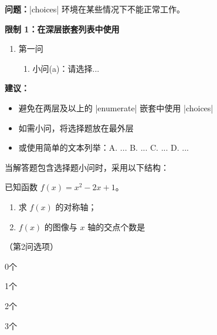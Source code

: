 \textbf{问题：}|choices| 环境在某些情况下不能正常工作。

\textbf{限制 1：在深层嵌套列表中使用}

\begin{latexcode}
  \begin{question}
    \begin{enumerate}
      \item 第一问
        \begin{enumerate}
          \item 小问(a)：请选择...\paren[A]
        \end{enumerate}
    \end{enumerate}
  \end{question}
\end{latexcode}

\textbf{建议：}
\begin{itemize}
  \item 避免在两层及以上的 |enumerate| 嵌套中使用 |choices|
  \item 如需小问，将选择题放在最外层
  \item 或使用简单的文本列举：A. ... B. ... C. ... D. ...
\end{itemize}

\begin{tcolorbox}[colback=blue!5!white, colframe=blue!75!black, title=\textbf{推荐做法}]
当解答题包含选择题小问时，采用以下结构：

\begin{latexcode}
\begin{problem}
  已知函数 $f(x) = x^2 - 2x + 1$。
  \begin{enumerate}
    \item 求 $f(x)$ 的对称轴；
    \item $f(x)$ 的图像与 $x$ 轴的交点个数是\paren[A]
  \end{enumerate}

  （第2问选项）
  \begin{choices}
    \item 0个  \item 1个  \item 2个  \item 3个
  \end{choices}
\end{problem}
\end{latexcode}
\end{tcolorbox}

